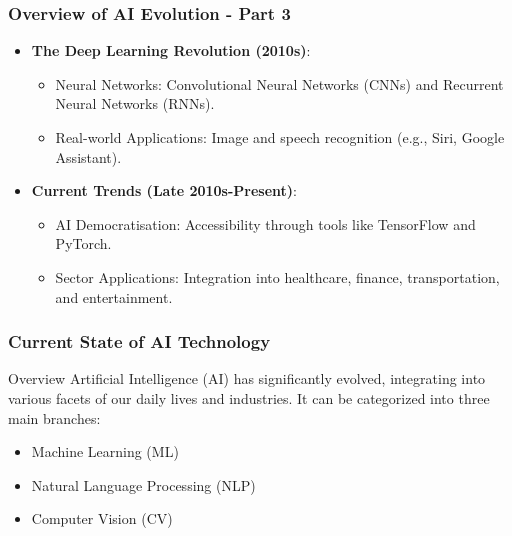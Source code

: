 \documentclass{beamer}
\begin{document}
\begin{frame}[fragile]
    \frametitle{Overview of AI Evolution - Part 3}
    \begin{itemize}
        \item \textbf{The Deep Learning Revolution (2010s)}:
        \begin{itemize}
            \item Neural Networks: Convolutional Neural Networks (CNNs) and Recurrent Neural Networks (RNNs).
            \item Real-world Applications: Image and speech recognition (e.g., Siri, Google Assistant).
        \end{itemize}

        \item \textbf{Current Trends (Late 2010s-Present)}:
        \begin{itemize}
            \item AI Democratisation: Accessibility through tools like TensorFlow and PyTorch.
            \item Sector Applications: Integration into healthcare, finance, transportation, and entertainment.
        \end{itemize}
    \end{itemize}
\end{frame}

\begin{frame}[fragile]
    \frametitle{Current State of AI Technology}
    \begin{block}{Overview}
        Artificial Intelligence (AI) has significantly evolved, integrating into various facets of our daily lives and industries. It can be categorized into three main branches:
    \end{block}
    \begin{itemize}
        \item Machine Learning (ML)
        \item Natural Language Processing (NLP)
        \item Computer Vision (CV)
    \end{itemize}
\end{frame}
\end{document}
